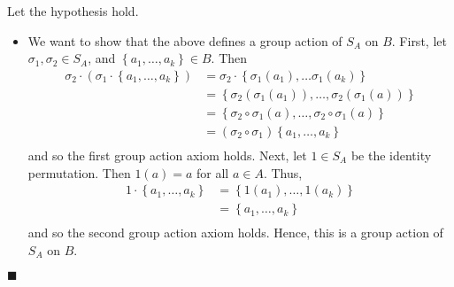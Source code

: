 \documentclass[12pt]{article}
\renewcommand{\qed}{\hfill$\blacksquare$}
\renewenvironment{proof}{\begin{addmargin}[1em]{0em}\begin{newproof}}{\end{newproof}\end{addmargin}\qed}
\begin{document}
\begin{proof}
Let the hypothesis hold.
\begin{itemize}
    \item We want to show that the above defines a group action of $S_A$ on $B$. First, let $\sigma_1, \sigma_2\in S_A$, and $\left\{a_1,\ldots,a_k\right\}\in B$. Then
    \begin{equation*}
        \begin{split}
            \sigma_2 \cdot \left(\sigma_1 \cdot  \left\{a_1,\ldots,a_k\right\} \right) & = \sigma_2 \cdot \left\{\sigma_1\left(a_1\right),\ldots \sigma_1\left(a_k\right)\right\} \\
            & = \left\{ \sigma_2\left(\sigma_1\left(a_1\right)\right),\ldots, \sigma_2\left(\sigma_1\left(a\right)\right)\right\} \\
            & = \left\{ \sigma_2 \circ \sigma_1 \left(a\right),\ldots, \sigma_2 \circ \sigma_1 \left(a\right) \right\} \\
            & = \left(\sigma_2 \circ \sigma_1\right)\left\{a_1,\ldots,a_k\right\} \\
        \end{split}
    \end{equation*}
    and so the first group action axiom holds. Next, let $1\in S_A$ be the identity permutation. Then $1\left(a\right) = a$ for all $a\in A$. Thus,
    \begin{equation*}
        \begin{split}
            1\cdot \left\{a_1,\ldots,a_k\right\} & = \left\{1\left(a_1\right),\ldots,1\left(a_k\right)\right\} \\
            & = \left\{a_1,\ldots,a_k\right\} \\
        \end{split}
    \end{equation*}
    and so the second group action axiom holds. Hence, this is a group action of $S_A$ on $B$.


\end{itemize}
\end{proof}
\end{document}
